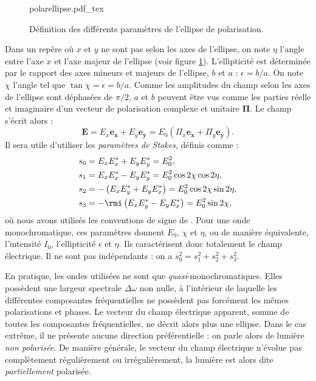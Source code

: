 \begin{figure}[!ht]
\centering
\def\svgwidth{0.6\columnwidth}
{polarellipse.pdf_tex}
\caption{Définition des différents paramètres de l'ellipse de polarisation.}
\label{Fig:polarellipse}
\end{figure}
Dans un repère où $x$ et $y$ ne sont pas selon les axes de l'ellipse, on note $\eta$ l'angle entre l'axe $x$ et l'axe majeur de l'ellipse (voir figure \ref{Fig:polarellipse}). L'ellipticité est déterminée par le rapport des axes mineurs et majeurs de l'ellipse, $b$ et $a$ : $\epsilon = b/a$. On note $\chi$ l'angle tel que $\tan\chi = \epsilon = b/a$. Comme les amplitudes du champ selon les axes de l'ellipse sont déphasées de $\pi/2$, $a$ et $b$ peuvent être vus comme les parties réelle et imaginaire d'un vecteur de polarisation complexe et unitaire $\bm{\Pi}$. Le champ s'écrit alors :
\[\bm{E} = E_x \bm{e_x} + E_y \bm{e_y} = E_0(\Pi_x \bm{e_x} + \Pi_y \bm{e_y}).\] 
Il sera utile d'utiliser les \textit{paramètres de Stokes}, définis comme :
\begin{align}
s_0 &= E_xE_x^*+E_yE_y^* =E_0^2,\nonumber\\
s_1 &= E_xE_x^*-E_yE_y^* =E_0^2\cos 2\chi\cos 2\eta ,\nonumber\\
s_2 &= -\left(E_xE_y^*+E_yE_x^*\right)=E_0^2\cos 2\chi\sin 2\eta,\nonumber\\
s_3 &= -\rmi\left(E_xE_y^*-E_yE_x^*\right)=E_0^2\sin 2\chi,	
\label{eq:stokes1}
\end{align}
où nous avons utilisés les conventions de signe de . Pour une onde monochromatique, ces paramètres donnent $E_0$, $\chi$ et $\eta$, ou de manière équivalente, l'intensité $I_0$, l'ellipticité $\epsilon$ et $\eta$. Ils caractérisent donc totalement le champ électrique. Il ne sont pas indépendants : on a $s_0^2 = s_1^2+s_2^2+s_3^2$. 

En pratique, les ondes utilisées ne sont que \textit{quasi}-monochromatiques. Elles possèdent une largeur spectrale $\Delta\omega$ non nulle, à l'intérieur de laquelle les différentes composantes fréquentielles ne possèdent pas forcément les mêmes polarisations et phases. Le vecteur du champ électrique apparent, somme de toutes les composantes fréquentielles, ne décrit alors plus une ellipse. Dans le cas extrême, il ne présente aucune direction préférentielle : on parle alors de lumière \textit{non polarisée}. De manière générale, le vecteur du champ électrique n'évolue pas complètement régulièrement ou irrégulièrement, la lumière est alors dite \textit{partiellement} polarisée.

